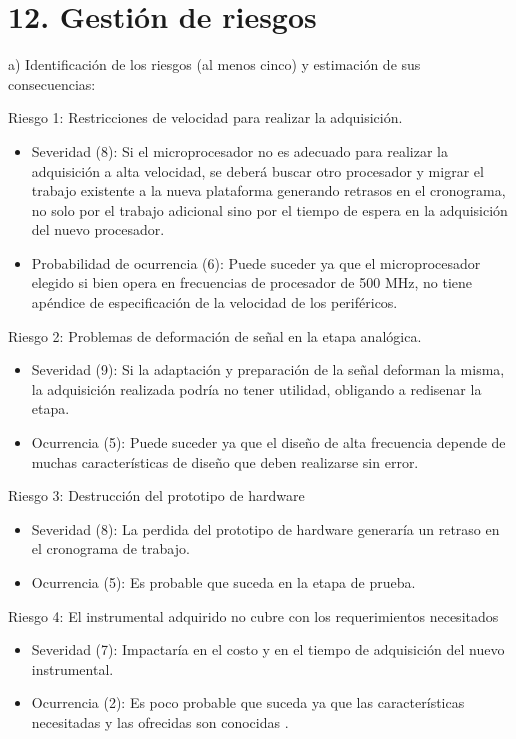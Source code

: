\documentclass[11pt]{charter}
\begin{document}
\section{12. Gestión de riesgos}
\label{sec:riesgos}

a) Identificación de los riesgos (al menos cinco) y estimación de sus consecuencias:
 
Riesgo 1: Restricciones de velocidad para realizar la adquisición. 
\begin{itemize}
\item Severidad (8): Si el microprocesador no es adecuado para realizar la adquisición a alta velocidad, se deberá buscar otro procesador y migrar el trabajo existente a la nueva plataforma generando retrasos en el cronograma, no solo por el trabajo adicional sino por el tiempo de espera en la adquisición del nuevo procesador.
\item Probabilidad de ocurrencia (6): Puede suceder ya que el microprocesador elegido si bien opera en frecuencias de procesador de 500 MHz, no tiene apéndice de especificación de la velocidad de los periféricos. 
\end{itemize}   

Riesgo 2: Problemas de deformación de señal en la etapa analógica.
\begin{itemize}
\item Severidad (9): Si la adaptación y preparación de la señal deforman la misma, la adquisición realizada podría no tener utilidad, obligando a redisenar la etapa.  
\item Ocurrencia (5): Puede suceder ya que el diseño de alta frecuencia depende de muchas características de diseño que deben realizarse sin error.
\end{itemize}

Riesgo 3: Destrucción del prototipo de hardware
\begin{itemize}
\item Severidad (8): La perdida del prototipo de hardware generaría un retraso en el cronograma de trabajo.  
\item Ocurrencia (5): Es probable que suceda en la etapa de prueba.  
\end{itemize}

Riesgo 4: El instrumental adquirido no cubre con los requerimientos necesitados
\begin{itemize}
\item Severidad (7): Impactaría en el costo y en el tiempo de adquisición del nuevo instrumental.  
\item Ocurrencia (2): Es poco probable que suceda ya que las características necesitadas y las ofrecidas son conocidas .  
\end{itemize}
\end{document}
